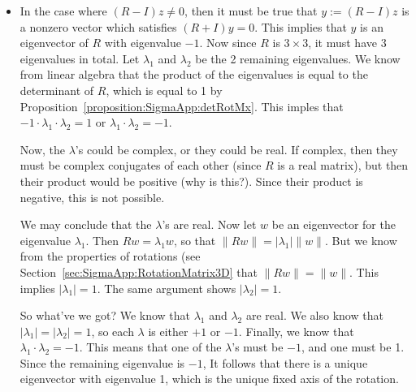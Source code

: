 \begin{itemize}
\item
In the case where $(R-I)z \neq 0$, then it must be true that $y := (R-I)z$ is a nonzero vector which satisfies $(R+I)y=0$. This implies that $y$ is an eigenvector of $R$ with eigenvalue $-1$. Now since $R$ is $3 \times 3$, it must have 3 eigenvalues in total. Let $\lambda_1$ and $\lambda_2$ be the 2 remaining eigenvalues.  We know from linear algebra that the product of the eigenvalues is equal to the determinant of $R$, which is equal to 1 by Proposition~\ref{proposition:SigmaApp:detRotMx}.  This imples that $-1 \cdot \lambda_1 \cdot \lambda_2 = 1$ or 
$ \lambda_1 \cdot \lambda_2 = -1$. 

Now, the $\lambda$'s could be complex, or they could be real. If complex, then they must be complex conjugates of each other (since $R$ is a real matrix), but then their product would be positive (why is this?). Since their product is negative, this is not possible. 

We may conclude that the $\lambda$'s are real. Now let $w$ be an eigenvector for the eigenvalue $\lambda_1$. Then $Rw = \lambda_1 w$, so that $ \lVert Rw \rVert = |\lambda_1| \lVert w \rVert$. But we know from the properties of rotations (see Section~\ref{sec:SigmaApp:RotationMatrix3D} that 
$ \lVert Rw \rVert =  \lVert w \rVert$. This implies $|\lambda_1|=1$. The same argument shows $|\lambda_2|=1$. 

So what've we got?  We know that $\lambda_1$ and $\lambda_2$ are real.  We also know that  $|\lambda_1|=|\lambda_2|=1$, so each $\lambda$ is either $+1$ or $-1$.  Finally, we know that $\lambda_1 \cdot \lambda_2 = -1$.  This means that one of the $\lambda$'s must be $-1$, and one must be 1. Since the remaining eigenvalue is $-1$, It follows that there is a unique eigenvector with eigenvalue 1, which is the unique fixed axis of the rotation.


\end{itemize}
